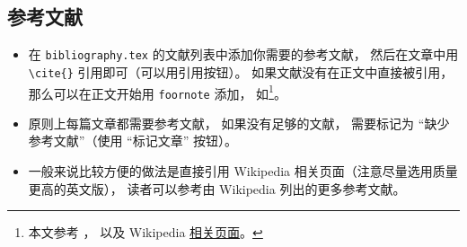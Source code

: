 \subsection{参考文献}
\begin{itemize}
\item 在 \verb|bibliography.tex| 的文献列表中添加你需要的参考文献， 然后在文章中用 \verb|\cite{}| 引用即可（可以用引用按钮）。 如果文献没有在正文中直接被引用， 那么可以在正文开始用 \verb|foornote| 添加， 如\footnote{本文参考 \cite{GriffE}， \cite{GriffQ} 以及 Wikipedia \href{https://www.wikipedia.org/}{相关页面}。}。
\item 原则上每篇文章都需要参考文献， 如果没有足够的文献， 需要标记为 “缺少参考文献”（使用 “标记文章” 按钮）。
\item 一般来说比较方便的做法是直接引用 Wikipedia 相关页面（注意尽量选用质量更高的英文版）， 读者可以参考由 Wikipedia 列出的更多参考文献。
\end{itemize}
